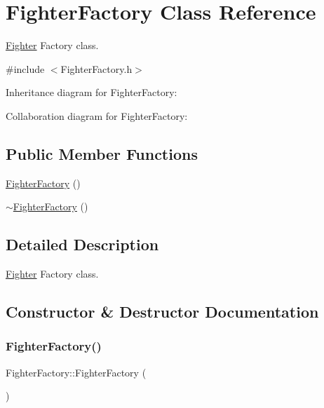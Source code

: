 \hypertarget{classFighterFactory}{}\section{Fighter\+Factory Class Reference}
\label{classFighterFactory}


\hyperlink{classFighter}{Fighter} Factory class.  




{\ttfamily \#include $<$Fighter\+Factory.\+h$>$}



Inheritance diagram for Fighter\+Factory\+:


Collaboration diagram for Fighter\+Factory\+:
\subsection*{Public Member Functions}
\begin{DoxyCompactItemize}
\item 
\hyperlink{classFighterFactory_a3853dc992255a5dbed462a4c14e62b2d}{Fighter\+Factory} ()
\item 
\hyperlink{classFighterFactory_a499708d032968c812916d5b7d1188c37}{$\sim$\+Fighter\+Factory} ()
\end{DoxyCompactItemize}


\subsection{Detailed Description}
\hyperlink{classFighter}{Fighter} Factory class. 

\subsection{Constructor \& Destructor Documentation}
\mbox{\label{classFighterFactory_a3853dc992255a5dbed462a4c14e62b2d}} 
\subsubsection{\texorpdfstring{Fighter\+Factory()}{FighterFactory()}}
{\footnotesize\ttfamily Fighter\+Factory\+::\+Fighter\+Factory (\begin{DoxyParamCaption}{ }\end{DoxyParamCaption})}

